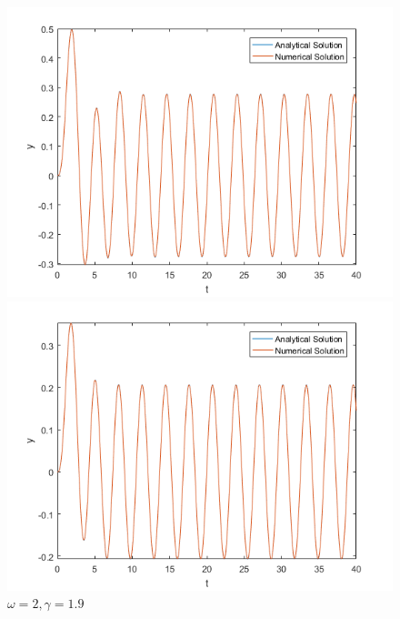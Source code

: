 \documentclass[10pt,a4paper]{report}
\begin{document}
\begin{figure}[ht]
\begin{minipage}[b]{0.5\linewidth}
\centering
\includegraphics[width=\textwidth]{q7w2g1.png}
\caption{$\omega=2, \gamma=1$}
\label{fig:figure1}
\end{minipage}
\hspace{0.5cm}
\begin{minipage}[b]{0.5\linewidth}
\centering
\includegraphics[width=\textwidth]{q7w2g19.png}
\caption{$\omega=2, \gamma=1.9$}
\label{fig:figure2}
\end{minipage}
\end{figure}

\newpage
\end{document}
